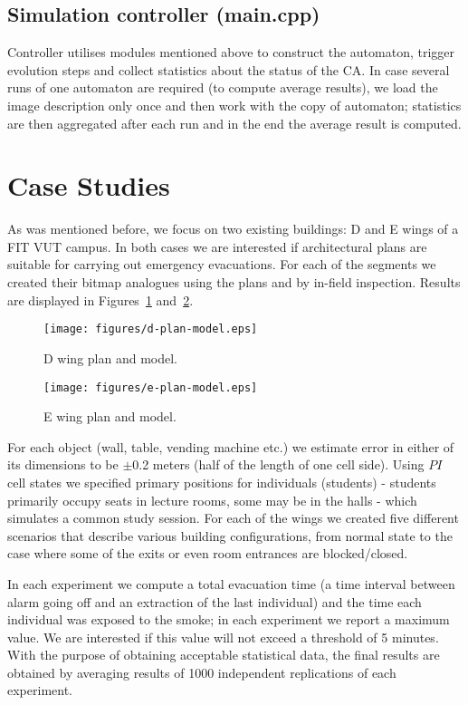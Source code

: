 \subsection{Simulation controller (main.cpp)}
Controller utilises modules mentioned above to construct the automaton,
trigger evolution steps and collect statistics about the status of the CA.
In case several runs of one automaton are required (to compute average
results), we load the image description only once and then work with
the copy of automaton; statistics are then aggregated after each run and
in the end the average result is computed.

\section{Case Studies}
As was mentioned before, we focus on two existing buildings: D and E wings of a 
FIT VUT campus.
In both cases we are interested if architectural plans are suitable for carrying
out emergency evacuations.
For each of the segments we created their bitmap analogues using the plans and
by in-field inspection.
Results are displayed in Figures~\ref{fig:dwing} and~\ref{fig:ewing}.

\begin{figure}
    \centering
    \texttt{[image: figures/d-plan-model.eps]}
    \caption{D wing plan and model.}
    \label{fig:dwing}
\end{figure}

\begin{figure}
    \centering
    \texttt{[image: figures/e-plan-model.eps]}
    \caption{E wing plan and model.}
    \label{fig:ewing}
\end{figure}

For each object (wall, table, vending machine etc.) we estimate error in either
of its dimensions to be $\pm$0.2 meters (half of the length of one cell side).
Using $PI$ cell states we specified primary positions for individuals
(students) - students primarily occupy seats in lecture rooms, some may be in
the halls - which simulates a common study session.
For each of the wings we created five different scenarios that describe
various building configurations, from normal state to the case where some of
the exits or even room entrances are blocked/closed.

In each experiment we compute a total evacuation time (a time interval between
alarm going off and an extraction of the last individual) and the time each
individual was exposed to the smoke;
in each experiment we report a maximum value.
We are interested if this value will not exceed a threshold of 5 minutes.
With the purpose of obtaining acceptable statistical data, the final results are
obtained by averaging results of 1000 independent replications of each
experiment.

